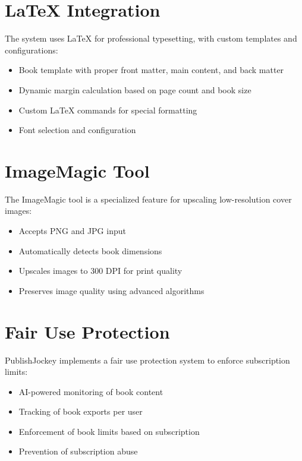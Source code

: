 \documentclass[12pt,a4paper]{book}
\begin{document}
\section{LaTeX Integration}

The system uses LaTeX for professional typesetting, with custom templates and configurations:

\begin{itemize}
  \item Book template with proper front matter, main content, and back matter
  \item Dynamic margin calculation based on page count and book size
  \item Custom LaTeX commands for special formatting
  \item Font selection and configuration
\end{itemize}

\section{ImageMagic Tool}

The ImageMagic tool is a specialized feature for upscaling low-resolution cover images:

\begin{itemize}
  \item Accepts PNG and JPG input
  \item Automatically detects book dimensions
  \item Upscales images to 300 DPI for print quality
  \item Preserves image quality using advanced algorithms
\end{itemize}

\section{Fair Use Protection}

PublishJockey implements a fair use protection system to enforce subscription limits:

\begin{itemize}
  \item AI-powered monitoring of book content
  \item Tracking of book exports per user
  \item Enforcement of book limits based on subscription
  \item Prevention of subscription abuse
\end{itemize}
\end{document}
